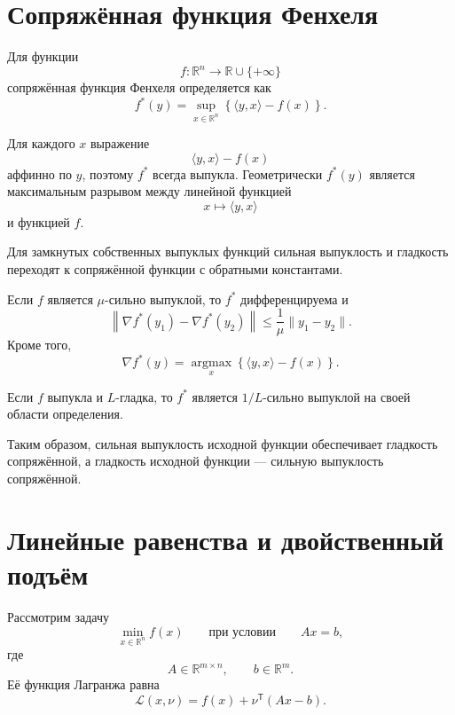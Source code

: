 \section{Сопряжённая функция Фенхеля}

\begin{definition}
Для функции
\[
    f\colon\mathbb R^n
    \to
    \mathbb R\cup\{+\infty\}
\]
сопряжённая функция Фенхеля определяется как
\[
    f^\ast(y)
    =
    \sup_{x\in\mathbb R^n}
    \left\{
        \langle y,x\rangle-f(x)
    \right\}.
\]
\end{definition}

Для каждого \(x\) выражение
\[
    \langle y,x\rangle-f(x)
\]
аффинно по \(y\), поэтому \(f^\ast\) всегда выпукла. Геометрически
\(f^\ast(y)\) является максимальным разрывом между линейной функцией
\[
    x\longmapsto\langle y,x\rangle
\]
и функцией \(f\).

Для замкнутых собственных выпуклых функций сильная выпуклость и
гладкость переходят к сопряжённой функции с обратными константами.

\begin{theorem}
Если \(f\) является \(\mu\)-сильно выпуклой, то \(f^\ast\)
дифференцируема и
\[
    \left\lVert
        \nabla f^\ast(y_1)
        -
        \nabla f^\ast(y_2)
    \right\rVert
    \le
    \frac1\mu
    \lVert y_1-y_2\rVert.
\]
Кроме того,
\[
    \nabla f^\ast(y)
    =
    \operatorname*{argmax}_{x}
    \left\{
        \langle y,x\rangle-f(x)
    \right\}.
\]
\end{theorem}

\begin{theorem}
Если \(f\) выпукла и \(L\)-гладка, то \(f^\ast\) является
\(1/L\)-сильно выпуклой на своей области определения.
\end{theorem}

Таким образом, сильная выпуклость исходной функции обеспечивает
гладкость сопряжённой, а гладкость исходной функции --- сильную
выпуклость сопряжённой.

\section{Линейные равенства и двойственный подъём}

Рассмотрим задачу
\[
    \min_{x\in\mathbb R^n}f(x)
    \qquad
    \text{при условии}
    \qquad
    Ax=b,
\]
где
\[
    A\in\mathbb R^{m\times n},
    \qquad
    b\in\mathbb R^m.
\]
Её функция Лагранжа равна
\[
    \mathcal L(x,\nu)
    =
    f(x)+\nu^{\mathsf T}(Ax-b).
\]

